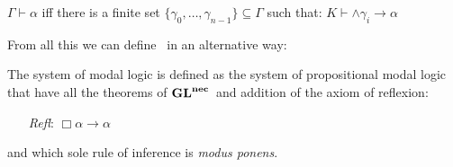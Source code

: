 \documentclass[../main.tex]{subfiles}
\begin{document}
\begin{lem}
	$\Gamma\vdash\alpha$ iff there is a finite set
$\{\gamma_0,\ldots,\gamma_{n-1}\}\subseteq \Gamma$ such that:
$K\vdash\wedge\gamma_i\rightarrow\alpha$
\end{lem}

From all this we can define \GLS\ in an alternative way:
\begin{defi}
	The system of modal logic  is defined as the system
	of propositional modal logic that have all the theorems of
	$\text{\textbf{GL}}^{\textbf{nec}}$\ and
	 addition of the axiom of reflexion: 
	 \begin{enumerate}
		 \item[\textit{Refl}:]$\Box\alpha\rightarrow\alpha$ 
 	\end{enumerate}
	and which sole rule of inference is \textit{modus ponens}. 
\end{defi}
\end{document}
